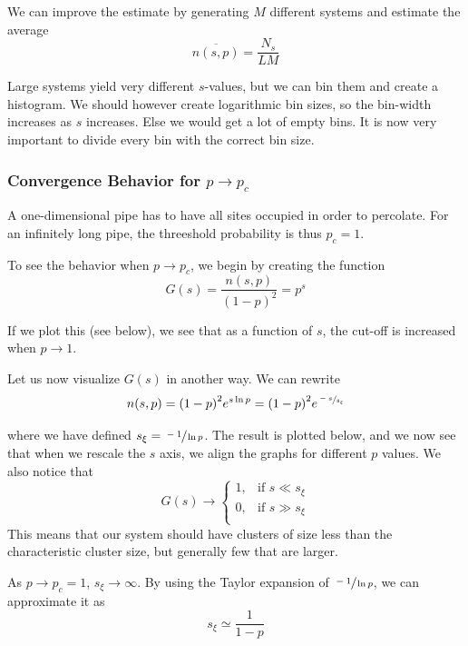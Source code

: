 \documentclass[11pt]{article}
\numberwithin{equation}{section}
\numberwithin{figure}{section}
\begin{document}
We can improve the estimate by generating $M$ different systems
and estimate the average
\begin{equation}
    \overline{n(s,p)} = \frac{N_s}{L M}
\end{equation}

Large systems yield very different $s$-values, but we
can bin them and create a histogram.
We should however create logarithmic bin sizes,
so the bin-width increases as $s$ increases.
Else we would get a lot of empty bins.
It is now very important to divide every bin with the correct
bin size.

\subsubsection{Convergence Behavior for $p\rightarrow p_c$}

A one-dimensional pipe has to have all sites occupied in order
to percolate. For an infinitely long pipe, 
the threeshold probability is thus $p_c = 1$.

To see the behavior when $p\rightarrow p_c$, we begin
by creating the function
\begin{equation}
    G(s) = \frac{n(s,p)}{{(1-p)}^2} = p^s
\end{equation}

If we plot this (see below), we see that as a function of $s$,
the cut-off is increased when $p\rightarrow 1$.

Let us now visualize $G(s)$ in another way. We can rewrite
\begin{equation}
    n(s,p) = {(1-p)}^2e^{s\ln p} 
    = {(1-p)}^2 e^{\sfrac{-s}{s_{\xi}}}
\end{equation}

where we have defined $s_{\xi} = \sfrac{-1}{\ln p}$.
The result is plotted below, and we now see that when we rescale
the $s$ axis, we align the graphs for different $p$ values.
We also notice that
\begin{equation}
    G(s) \rightarrow
    \begin{cases}
        1, &\text{if }s \ll s_{\xi}\\
        0, &\text{if }s \gg s_{\xi}\\
    \end{cases}
\end{equation}
This means that our system should have clusters of size
less than the characteristic cluster size,
but generally few that are larger.

As $p\rightarrow p_c = 1$, $s_{\xi} \rightarrow \infty$.
By using the Taylor expansion of $\sfrac{-1}{\ln p}$,
we can approximate it as
\begin{equation}
    s_{\xi} \simeq \frac{1}{1-p}
\end{equation}
\end{document}
